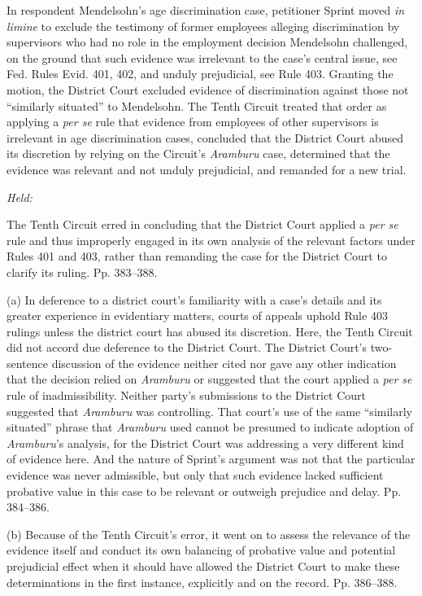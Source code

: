 
\setcounter{page}{379}

\noindent In respondent Mendelsohn's age discrimination case, petitioner Sprint
moved \emph{in limine} to exclude the testimony of former employees
alleging discrimination by supervisors who had no role in the employment
decision Mendelsohn challenged, on the ground that such evidence was
irrelevant to the case's central issue, see Fed. Rules Evid.
401, 402, and unduly prejudicial, see Rule 403. Granting the
motion, the District Court excluded evidence of discrimination against
those not ``similarly situated'' to Mendelsohn. The Tenth Circuit
treated that order as applying a \emph{per se} rule that evidence from
employees of other supervisors is irrelevant in age discrimination
cases, concluded that the District Court abused its discretion by
relying on the Circuit's \emph{Aramburu} case, determined that the
evidence was relevant and not unduly prejudicial, and remanded for a new
trial.

\emph{Held:}

\noindent The Tenth Circuit erred in concluding that the District Court applied a
\emph{per se} rule and thus improperly engaged in its own analysis of the
relevant factors under Rules 401 and 403, rather than remanding the case
for the District Court to clarify its ruling. Pp. 383--388.

  (a) In deference to a district court's familiarity with a case's
details and its greater experience in evidentiary matters, courts of
appeals uphold Rule 403 rulings unless the district court has abused its
discretion. Here, the Tenth Circuit did not accord due deference to the
District Court. The District Court's two-sentence discussion of the
evidence neither cited nor gave any other indication that the decision
relied on \emph{Aramburu} or suggested that the court applied a \emph{per se}
rule of inadmissibility. Neither party's submissions to the District
Court suggested that \emph{Aramburu} was controlling. That court's use
of the same ``similarly situated'' phrase that \emph{Aramburu} used
cannot be presumed to indicate adoption of \emph{Aramburu}'s analysis,
for the District Court was addressing a very different kind of evidence
here. And the nature of Sprint's argument was not that the particular
evidence was never admissible, but only that such evidence lacked
sufficient probative value in this case to be relevant or outweigh
prejudice and delay. Pp. 384--386.

  (b) Because of the Tenth Circuit's error, it went on to assess
the relevance of the evidence itself and conduct its own balancing of
probative \newpage  value and potential prejudicial effect when it should
have allowed the District Court to make these determinations in the
first instance, explicitly and on the record. Pp. 386--388.

